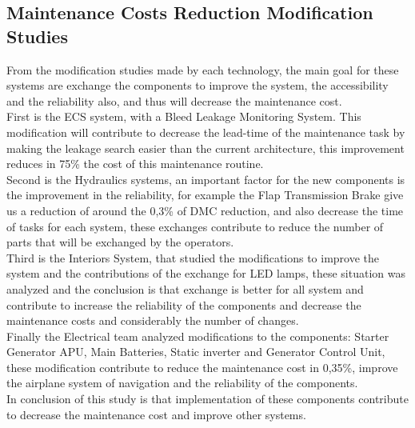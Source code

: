 \subsection{Maintenance Costs Reduction Modification Studies}
From the modification studies made by each technology, the main goal for these systems are exchange the components to improve the system, the accessibility and the reliability also, and thus will decrease the maintenance cost. 
\\First is the ECS system, with a Bleed Leakage Monitoring System. This modification will contribute to decrease the lead-time of the maintenance task by making the leakage search easier than the current architecture, this improvement reduces in 75\% the cost of this maintenance routine.
\\Second is the Hydraulics systems, an important factor for the new components is the improvement in the reliability, for example the Flap Transmission Brake give us a reduction of around the 0,3\% of DMC reduction, and also decrease the time of tasks for each system, these exchanges contribute to reduce the number of parts that will be exchanged by the operators. 
\\Third is the Interiors System, that studied the modifications to improve the system and the contributions of the exchange for LED lamps, these situation was analyzed and the conclusion is that exchange is better for all system and contribute to increase the reliability of the components and decrease the maintenance costs and considerably the number of changes.
\\Finally the Electrical team analyzed modifications to the components: Starter Generator APU, Main Batteries, Static inverter and Generator Control Unit, these modification contribute to reduce the maintenance cost in 0,35\%, improve the airplane system of navigation and the reliability of the components.
\\In conclusion of this study is that implementation of these components contribute to decrease the maintenance cost and improve other systems.

